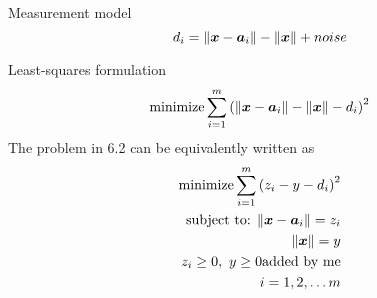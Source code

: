 Measurement model
\begin{equation} \label{eq:6.1}
d_i = \|\mbox{\boldmath$x$} - \mbox{\boldmath$a$}_i\| - \|\mbox{\boldmath$x$}\| + noise
\end{equation}

Least-squares formulation
\begin{equation} \label{eq:6.2}
\mathop{\mbox{minimize}} \sum^m_{i=1}\left( \|\mbox{\boldmath$x$} - \mbox{\boldmath$a$}_i\| - \|\mbox{\boldmath$x$}\| - d_i\right)^2
\end{equation}
The problem in 6.2 can be equivalently written as
\begin{eqnarray} \label{eq:6.3}
\mathop{\mbox{minimize}} \sum^m_{i=1}\left( z_i - y - d_i\right)^2\\
\nonumber
\mbox{subject to: } \|\mbox{\boldmath$x$} - \mbox{\boldmath$a$}_i\| = z_i \\
\nonumber
\|\mbox{\boldmath$x$}\| = y \\
\nonumber
z_i \geq 0, \ y \geq 0 \mbox{added by me}
\\ \nonumber  i = 1, 2, \ldots m
\end{eqnarray}

